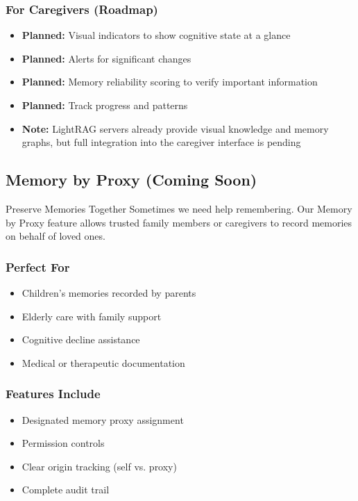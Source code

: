 \documentclass[11pt,letterpaper]{article}
\begin{document}
\subsubsection{For Caregivers (Roadmap)}
\begin{itemize}[leftmargin=*]
    \item \textbf{Planned:} Visual indicators to show cognitive state at a glance
    \item \textbf{Planned:} Alerts for significant changes
    \item \textbf{Planned:} Memory reliability scoring to verify important information
    \item \textbf{Planned:} Track progress and patterns
    \item \textbf{Note:} LightRAG servers already provide visual knowledge and memory graphs, but full integration into the caregiver interface is pending
\end{itemize}

\subsection{Memory by Proxy (Coming Soon)}

\begin{featurebox}{Preserve Memories Together}
Sometimes we need help remembering. Our Memory by Proxy feature allows trusted family members or caregivers to record memories on behalf of loved ones.
\end{featurebox}

\subsubsection{Perfect For}
\begin{itemize}[leftmargin=*]
    \item Children's memories recorded by parents
    \item Elderly care with family support
    \item Cognitive decline assistance
    \item Medical or therapeutic documentation
\end{itemize}

\subsubsection{Features Include}
\begin{itemize}[leftmargin=*]
    \item Designated memory proxy assignment
    \item Permission controls
    \item Clear origin tracking (self vs. proxy)
    \item Complete audit trail
\end{itemize}
\end{document}

